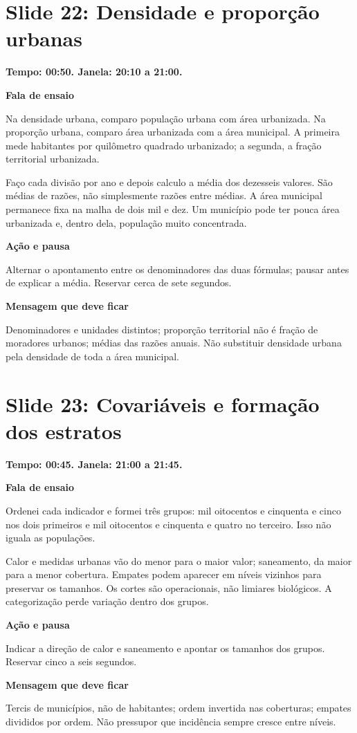 \documentclass[11pt,a4paper]{article}
\newcommand{\bloco}[1]{\par\Needspace{3\baselineskip}\textbf{#1}\par}
\newcommand{\slide}[2]{\Needspace{13\baselineskip}\section*{Slide #1: #2}}
\begin{document}
\par\begin{minipage}{\textwidth}
\slide{22}{Densidade e proporção urbanas}
{\color{azul}\textbf{Tempo: 00:50. Janela: 20:10 a 21:00.}}\par
\bloco{Fala de ensaio}
Na densidade urbana, comparo população urbana com área urbanizada. Na proporção urbana, comparo área urbanizada com a área municipal. A primeira mede habitantes por quilômetro quadrado urbanizado; a segunda, a fração territorial urbanizada.

Faço cada divisão por ano e depois calculo a média dos dezesseis valores. São médias de razões, não simplesmente razões entre médias. A área municipal permanece fixa na malha de dois mil e dez. Um município pode ter pouca área urbanizada e, dentro dela, população muito concentrada.
\bloco{Ação e pausa}
Alternar o apontamento entre os denominadores das duas fórmulas; pausar antes de explicar a média. Reservar cerca de sete segundos.
\bloco{Mensagem que deve ficar}
Denominadores e unidades distintos; proporção territorial não é fração de moradores urbanos; médias das razões anuais. Não substituir densidade urbana pela densidade de toda a área municipal.
\end{minipage}\par\bigskip
\par\begin{minipage}{\textwidth}
\slide{23}{Covariáveis e formação dos estratos}
{\color{azul}\textbf{Tempo: 00:45. Janela: 21:00 a 21:45.}}\par
\bloco{Fala de ensaio}
Ordenei cada indicador e formei três grupos: mil oitocentos e cinquenta e cinco nos dois primeiros e mil oitocentos e cinquenta e quatro no terceiro. Isso não iguala as populações.

Calor e medidas urbanas vão do menor para o maior valor; saneamento, da maior para a menor cobertura. Empates podem aparecer em níveis vizinhos para preservar os tamanhos. Os cortes são operacionais, não limiares biológicos. A categorização perde variação dentro dos grupos.
\bloco{Ação e pausa}
Indicar a direção de calor e saneamento e apontar os tamanhos dos grupos. Reservar cinco a seis segundos.
\bloco{Mensagem que deve ficar}
Tercis de municípios, não de habitantes; ordem invertida nas coberturas; empates divididos por ordem. Não pressupor que incidência sempre cresce entre níveis.
\end{minipage}\par\bigskip
\end{document}
